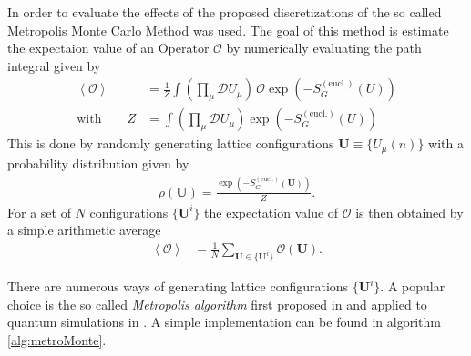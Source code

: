 In order to evaluate the effects of the proposed discretizations of \SUTwo the so called Metropolis Monte Carlo Method was used. The goal of this method is estimate the expectaion value of an Operator $\mathcal{O}$ by numerically evaluating the path integral given by
\begin{align*}
 \left\langle \mathcal{O} \right\rangle & = \frac{1}{Z}\int \left( \prod_\mu \mathcal{D} U_\mu \right) \, \mathcal{O} \exp \left( - S_G^{(\textrm{eucl.})}(U)\right) \\
 \textrm{with} \qquad Z                 & = \int \left( \prod_\mu \mathcal{D} U_\mu \right) \exp \left( - S_G^{(\textrm{eucl.})}(U)\right)
\end{align*}
This is done by randomly generating lattice configurations $\boldsymbol{U} \equiv \{ U_\mu(n) \}$ with a probability distribution given by
\begin{align*}
 \rho ( \boldsymbol{U} ) = \frac{\exp\left(  -S_G^{(\textrm{eucl.})}(\boldsymbol{U}) \right)}{Z} \textrm{.}
\end{align*}
For a set of $N$ configurations $\{ \boldsymbol{U}^i \}$ the expectation value of $\mathcal{O}$ is then obtained by a simple arithmetic average
\begin{align*}
 \left\langle \mathcal{O} \right\rangle & = \frac{1}{N} \sum_{\boldsymbol{U} \in \{ \boldsymbol{U}^i \}} \mathcal{O} (\boldsymbol{U}) \textrm{.}
\end{align*}

There are numerous ways of generating lattice configurations $\{ \boldsymbol{U}^i \}$. A popular choice is the so called \emph{Metropolis algorithm} first proposed in \cite{metropolis:1953} and applied to quantum simulations in \cite{Creutz:1981}. A simple implementation can be found in algorithm \ref{alg:metroMonte}.

